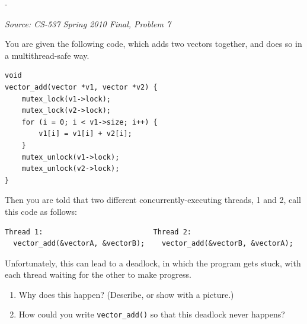 \documentclass[11pt,a4paper]{article}
\makeatletter
\newcommand{\keepspace}[1]{\par\penalty-100\begingroup
  \setlength{\dimen@}{#1}\dimen@ii\pagegoal\advance\dimen@ii-\pagetotal
  \ifdim\dimen@>\dimen@ii\ifdim\dimen@ii>\z@\vfil\fi\break\fi\endgroup}
\newcounter{qn}[section]
\newenvironment{Qn}[4]{%
  \refstepcounter{qn}\keepspace{7\baselineskip}%
  \begin{tcolorbox}[qboxstyle, title={Q\thesection.\theqn\ \ [#1 \textbar\ #2]\ \ #4}]%
  {\footnotesize\color{g3}\textit{Source: #3}}\par\smallskip%
}{%
  \end{tcolorbox}%
}
\makeatother
\begin{document}
\begin{Qn}{Hard}{Lect 20}{CS-537 Spring 2010 Final, Problem 7}{\texttt{vector\_add}: lock-order inversion on two vectors}
You are given the following code, which adds two vectors together, and does
so in a multithread-safe way.
\begin{lstlisting}[numbers=none]
void
vector_add(vector *v1, vector *v2) {
    mutex_lock(v1->lock);
    mutex_lock(v2->lock);
    for (i = 0; i < v1->size; i++) {
        v1[i] = v1[i] + v2[i];
    }
    mutex_unlock(v1->lock);
    mutex_unlock(v2->lock);
}
\end{lstlisting}
Then you are told that two different concurrently-executing threads, 1 and
2, call this code as follows:
\begin{lstlisting}[numbers=none]
Thread 1:                          Thread 2:
  vector_add(&vectorA, &vectorB);    vector_add(&vectorB, &vectorA);
\end{lstlisting}
Unfortunately, this can lead to a deadlock, in which the program gets stuck,
with each thread waiting for the other to make progress.
\begin{enumerate}
  \item[(a)] Why does this happen? (Describe, or show with a picture.)
  \item[(b)] How could you write \texttt{vector\_add()} so that this
        deadlock never happens?
\end{enumerate}
\end{Qn}
\end{document}
